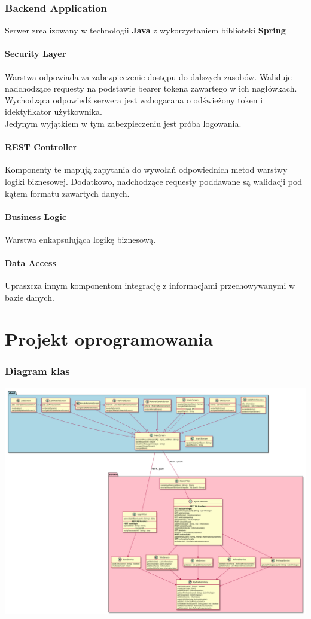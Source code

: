 \documentclass[oneside]{scrreprt}
\begin{document}
\subsection{Backend Application}
Serwer zrealizowany w technologii \textbf{Java} z wykorzystaniem biblioteki \textbf{Spring}

\subsubsection{Security Layer}
Warstwa odpowiada za zabezpieczenie dostępu do dalszych zasobów. 
Waliduje nadchodzące requesty na podstawie bearer tokena zawartego w ich nagłówkach.
Wychodząca odpowiedź serwera jest wzbogacana o odświeżony token i idektyfikator użytkownika.\\
Jedynym wyjątkiem w tym zabezpieczeniu jest próba logowania.

\subsubsection{REST Controller}
Komponenty te mapują zapytania do wywołań odpowiednich metod warstwy logiki biznesowej. 
Dodatkowo, nadchodzące requesty poddawane są walidacji pod kątem formatu zawartych danych.

\subsubsection{Business Logic}
Warstwa enkapsulująca logikę biznesową.

\subsubsection{Data Access}
Upraszcza innym komponentom integrację z informacjami przechowywanymi w bazie danych. 

\chapter{Projekt oprogramowania}

\subsection{Diagram klas}
\includegraphics[width=\textwidth, keepaspectratio]{graphics/software_project_class_diagram.pdf}
\end{document}
